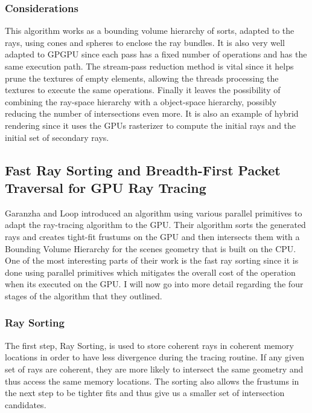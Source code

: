\documentclass{llncs}
\begin{document}
\subsubsection{Considerations}

This algorithm works as a bounding volume hierarchy of sorts, adapted to the rays, using cones and spheres to enclose the ray bundles. It is also very well adapted to GPGPU since each pass has a fixed number of operations and has the same execution path. The stream-pass reduction method is vital since it helps prune the textures of empty elements, allowing the threads processing the textures to execute the same operations. Finally it leaves the possibility of combining the ray-space hierarchy with a object-space hierarchy, possibly reducing the number of intersections even more. It is also an example of hybrid rendering since it uses the GPUs rasterizer to compute the initial rays and the initial set of secondary rays.

%
\subsection{Fast Ray Sorting and Breadth-First Packet Traversal for GPU Ray Tracing}
%

Garanzha and Loop \cite{GaranzhaLoop10} introduced an algorithm using various parallel primitives to adapt the ray-tracing algorithm to the GPU. Their algorithm sorts the generated rays and creates tight-fit frustums on the GPU and then intersects them with a Bounding Volume Hierarchy for the scenes geometry that is built on the CPU. One of the most interesting parts of their work is the fast ray sorting since it is done using parallel primitives which mitigates the overall cost of the operation when its executed on the GPU. I will now go into more detail regarding the four stages of the algorithm that they outlined.

\medskip

\subsubsection{Ray Sorting}

The first step, Ray Sorting, is used to store coherent rays in coherent memory locations in order to have less divergence during the tracing routine. If any given set of rays are coherent, they are more likely to intersect the same geometry and thus access the same memory locations. The sorting also allows the frustums in the next step to be tighter fits and thus give us a smaller set of intersection candidates.
\end{document}
